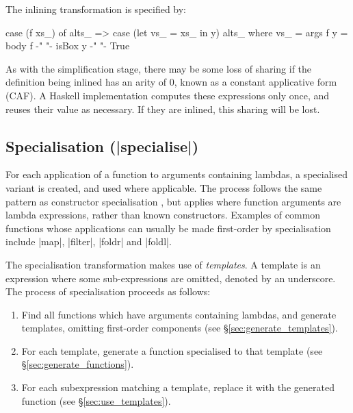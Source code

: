 \begin{definition}
The inlining transformation is specified by:

\ignore\begin{code}
case (f xs_) of alts_
    => case (let vs_ = xs_ in y) alts_
    where
        vs_ = args f
        y = body f
        {-"  "-} isBox y {-"  "-} True
\end{code}
\end{definition}

As with the simplification stage, there may be some loss of sharing if the definition being inlined has an arity of 0, known as a constant applicative form (CAF). A Haskell implementation computes these expressions only once, and reuses their value as necessary. If they are inlined, this sharing will be lost.

\subsection{Specialisation (|specialise|)}

For each application of a function to arguments containing lambdas, a specialised variant is created, and used where applicable. The process follows the same pattern as constructor specialisation \cite{spj:specconstr}, but applies where function arguments are lambda expressions, rather than known constructors. Examples of common functions whose applications can usually be made first-order by specialisation include |map|, |filter|, |foldr| and |foldl|.

The specialisation transformation makes use of \textit{templates}. A template is an expression where some sub-expressions are omitted, denoted by an underscore. The process of specialisation proceeds as follows:

\begin{enumerate}
\item Find all functions which have arguments containing lambdas, and generate templates, omitting first-order components (see \S\ref{sec:generate_templates}).
\item For each template, generate a function specialised to that template (see \S\ref{sec:generate_functions}).
\item For each subexpression matching a template, replace it with the generated function (see \S\ref{sec:use_templates}).
\end{enumerate}

